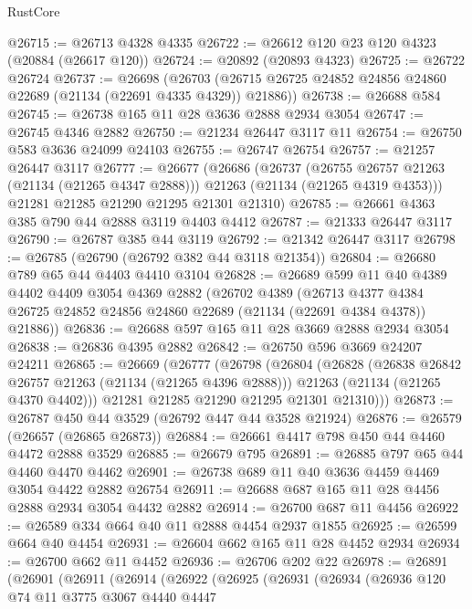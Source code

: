 \begin{lexlean}{RustCore}
\begin{coremodule}
@26715 := @26713 @4328 @4335
@26722 := @26612 @120 @23 @120 @4323 (@20884 (@26617 @120))
@26724 := @20892 (@20893 @4323)
@26725 := @26722 @26724
@26737 := @26698
    (@26703 (@26715 @26725 @24852 @24856 @24860 @22689 (@21134 (@22691 @4335 @4329)) @21886))
@26738 := @26688 @584
@26745 := @26738 @165 @11 @28 @3636 @2888 @2934 @3054
@26747 := @26745 @4346 @2882
@26750 := @21234 @26447 @3117 @11
@26754 := @26750 @583 @3636 @24099 @24103
@26755 := @26747 @26754
@26757 := @21257 @26447 @3117
@26777 := @26677
    (@26686
      (@26737
        (@26755 @26757 @21263 (@21134 (@21265 @4347 @2888)))
        @21263
        (@21134 (@21265 @4319 @4353)))
      @21281
      @21285
      @21290
      @21295
      @21301
      @21310)
@26785 := @26661 @4363 @385 @790 @44 @2888 @3119 @4403 @4412
@26787 := @21333 @26447 @3117
@26790 := @26787 @385 @44 @3119
@26792 := @21342 @26447 @3117
@26798 := @26785 (@26790 (@26792 @382 @44 @3118 @21354))
@26804 := @26680 @789 @65 @44 @4403 @4410 @3104
@26828 := @26689
    @599
    @11
    @40
    @4389
    @4402
    @4409
    @3054
    @4369
    @2882
    (@26702
      @4389
      (@26713 @4377 @4384 @26725 @24852 @24856 @24860 @22689 (@21134 (@22691 @4384 @4378)) @21886))
@26836 := @26688 @597 @165 @11 @28 @3669 @2888 @2934 @3054
@26838 := @26836 @4395 @2882
@26842 := @26750 @596 @3669 @24207 @24211
@26865 := @26669
    (@26777
      (@26798
        (@26804
          (@26828
            (@26838 @26842 @26757 @21263 (@21134 (@21265 @4396 @2888)))
            @21263
            (@21134 (@21265 @4370 @4402)))
          @21281
          @21285
          @21290
          @21295
          @21301
          @21310)))
@26873 := @26787 @450 @44 @3529 (@26792 @447 @44 @3528 @21924)
@26876 := @26579 (@26657 (@26865 @26873))
@26884 := @26661 @4417 @798 @450 @44 @4460 @4472 @2888 @3529
@26885 := @26679 @795
@26891 := @26885 @797 @65 @44 @4460 @4470 @4462
@26901 := @26738 @689 @11 @40 @3636 @4459 @4469 @3054 @4422 @2882 @26754
@26911 := @26688 @687 @165 @11 @28 @4456 @2888 @2934 @3054 @4432 @2882
@26914 := @26700 @687 @11 @4456
@26922 := @26589 @334 @664 @40 @11 @2888 @4454 @2937 @1855
@26925 := @26599 @664 @40 @4454
@26931 := @26604 @662 @165 @11 @28 @4452 @2934
@26934 := @26700 @662 @11 @4452
@26936 := @26706 @202 @22
@26978 := @26891
    (@26901
      (@26911
        (@26914
          (@26922
            (@26925
              (@26931
                (@26934
                  (@26936
                    @120
                    @74
                    @11
                    @3775
                    @3067
                    @4440
                    @4447

\end{coremodule}
\end{lexlean}
